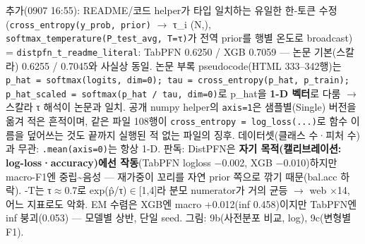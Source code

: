 추가(0907 16:55): README/\allowbreak{}코드 helper가 타입 일치하는 유일한 한-토큰 수정(\texttt{cross\_\allowbreak{}\allowbreak{}en\allowbreak{}tropy(y\_\allowbreak{}\allowbreak{}prob,\allowbreak{} pr\allowbreak{}ior)}  \ensuremath{\rightarrow}  τ\_\allowbreak{}i (N,), \texttt{softmax\_\allowbreak{}\allowbreak{}temperat\allowbreak{}ure(P\_\allowbreak{}\allowbreak{}te\allowbreak{}st\_\allowbreak{}\allowbreak{}avg,\allowbreak{} \allowbreak{}T=\allowbreak{}\allowbreak{}τ)}가 전역 prior를 행별 온도로 broadcast) =\allowbreak{} \texttt{distpfn\_\allowbreak{}\allowbreak{}t\_\allowbreak{}\allowbreak{}readme\allowbreak{}\_\allowbreak{}\allowbreak{}literal\allowbreak{}}: TabPFN 0.6250 /\allowbreak{} XGB 0.7059 — 논문 기본(스칼라) 0.6255 /\allowbreak{} 0.7045와 사실상 동일. 논문 부록 pseudocode(HTML 333–342행)는 \texttt{p\_\allowbreak{}\allowbreak{}hat =\allowbreak{}\allowbreak{} \allowbreak{}softmax(\allowbreak{}logits,\allowbreak{} \allowbreak{}dim=\allowbreak{}\allowbreak{}0); \allowbreak{}tau =\allowbreak{}\allowbreak{} cr\allowbreak{}oss\_\allowbreak{}\allowbreak{}entr\allowbreak{}opy(p\_\allowbreak{}\allowbreak{}ha\allowbreak{}t,\allowbreak{} p\_\allowbreak{}\allowbreak{}tra\allowbreak{}in); p\_\allowbreak{}\allowbreak{}h\allowbreak{}at\_\allowbreak{}\allowbreak{}scale\allowbreak{}d =\allowbreak{}\allowbreak{} soft\allowbreak{}max(p\_\allowbreak{}\allowbreak{}ha\allowbreak{}t /\allowbreak{}\allowbreak{} tau,\allowbreak{} dim=\allowbreak{}\allowbreak{}0)}로 p\_\allowbreak{}hat을 \textbf{1-D 벡터}로 다룸  \ensuremath{\rightarrow}  스칼라 τ 해석이 논문과 일치. 공개 numpy helper의 \texttt{axis=\allowbreak{}\allowbreak{}1}은 샘플별(Single) 버전을 옮겨 적은 흔적이며, 같은 파일 108행이 \texttt{cross\_\allowbreak{}\allowbreak{}en\allowbreak{}tropy =\allowbreak{}\allowbreak{} \allowbreak{}log\_\allowbreak{}\allowbreak{}loss\allowbreak{}(.\allowbreak{}.\allowbreak{}.\allowbreak{})}로 함수 이름을 덮어쓰는 것도 끝까지 실행된 적 없는 파일의 징후. 데이터셋(클래스 수·피처 수)과 무관: \texttt{.\allowbreak{}mean(ax\allowbreak{}is=\allowbreak{}\allowbreak{}0)}는 항상 1-D. 판독: DistPFN은 \textbf{자기 목적(캘리브레이션: log-loss·accuracy)에선 작동}(TabPFN logloss −0.002, XGB −0.010)하지만 macro-F1엔 중립\textasciitilde{}음성 — 재가중이 꼬리를 자연 prior 쪽으로 깎기 때문(bal.acc 하락). -T는 τ\ensuremath{\approx}0.7로 exp(p̂/\allowbreak{}τ)\ensuremath{\in}[1,4]라 분모 numerator가 거의 균등  \ensuremath{\rightarrow}  web ×14, 어느 지표로도 악화. EM 수렴은 XGB엔 macro +\allowbreak{}0.012(inf 0.458)이지만 TabPFN엔 inf 붕괴(0.053) — 모델별 상반, 단일 seed. 그림: 9b(사전분포 비교, log), 9c(변형별 F1).

